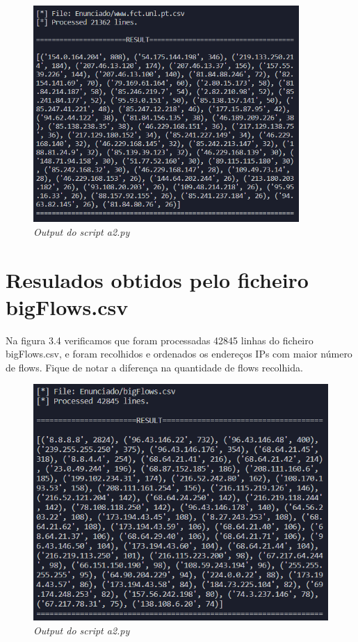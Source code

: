 \begin{figure}[h]
    \label{high}
    \centering
    \includegraphics[width=0.9\textwidth]{Images/a2/a2_a.png}
    \caption{\textit{Output do script a2.py}}
\end{figure}

\newpage


\section{Resulados obtidos pelo ficheiro bigFlows.csv}

Na figura 3.4 verificamos que foram processadas 42845 linhas do ficheiro bigFlows.csv, e foram recolhidos e ordenados os endereços IPs com maior número de flows. Fique de notar a diferença na quantidade de flows recolhida.

\begin{figure}[h]
    \label{high}
    \centering
    \includegraphics[width=1\textwidth]{Images/a2/a2_b.png}
    \caption{\textit{Output do script a2.py}}
\end{figure}
